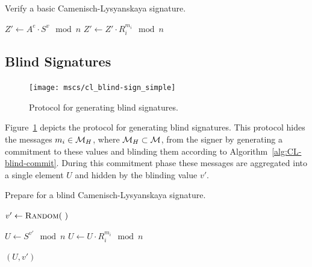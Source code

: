 \begin{algorithm}
  \caption{Verify a basic Camenisch-Lysyanskaya signature.}
  \label{alg:CL-verify}
  \addtolength{\baselineskip}{1mm}
  \begin{algorithmic}[1]
      \State $Z' \gets A^e \cdot S^v \mod n$
        \State $Z' \gets Z' \cdot R_i^{m_i} \mod n$
      \EndFor

        \Return {}
      \EndIf

      \Return {}
    \EndFunction
  \end{algorithmic}
\end{algorithm}

\subsection{Blind Signatures}\label{sec:cl_blind}

\begin{figure}[ht]
  \centering
  \texttt{[image: mscs/cl\_blind-sign\_simple]}
  \caption{Protocol for generating blind signatures.}
  \label{msc:cl_blind-sign}
\end{figure}

Figure~\ref{msc:cl_blind-sign} depicts the protocol for generating blind
signatures. This protocol hides the messages $m_i \in \mathcal{M}_H$, where
$\mathcal{M}_H \subset \mathcal{M}$, from the signer by generating a commitment to these values
and blinding them according to Algorithm~\ref{alg:CL-blind-commit}. During this
commitment phase these messages are aggregated into a single element $U$ and
hidden by the blinding value $v'$.

\begin{algorithm}
  \caption{Prepare for a blind Camenisch-Lysyanskaya signature.}
  \label{alg:CL-blind-commit}
  \addtolength{\baselineskip}{1mm}
  \begin{algorithmic}[1]
      \State $v' \gets \Call{Random}{~}$

      \State $U \gets S^{v'} \mod n$
        \State $U \gets U \cdot R_i^{m_i} \mod n$
      \EndFor

      \Return $(U, v')$
    \EndFunction
  \end{algorithmic}
\end{algorithm}

